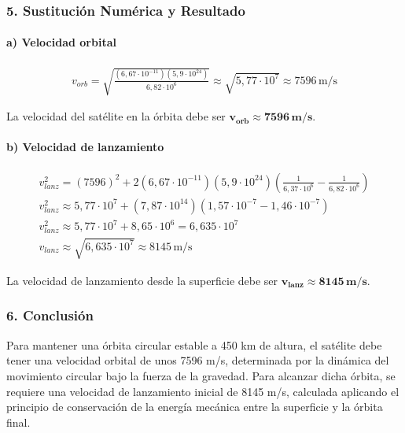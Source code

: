\subsubsection*{5. Sustitución Numérica y Resultado}
\paragraph{a) Velocidad orbital}
\begin{gather}
    v_{orb} = \sqrt{\frac{(6,67\cdot10^{-11})(5,9\cdot10^{24})}{6,82 \cdot 10^6}} \approx \sqrt{5,77 \cdot 10^7} \approx 7596 \, \text{m/s}
\end{gather}
\begin{cajaresultado}
La velocidad del satélite en la órbita debe ser $\boldsymbol{v_{orb} \approx 7596 \, \textbf{m/s}}$.
\end{cajaresultado}

\paragraph{b) Velocidad de lanzamiento}
\begin{gather}
    v_{lanz}^2 = (7596)^2 + 2(6,67\cdot10^{-11})(5,9\cdot10^{24})\left(\frac{1}{6,37\cdot10^6} - \frac{1}{6,82\cdot10^6}\right) \nonumber \\
    v_{lanz}^2 \approx 5,77 \cdot 10^7 + (7,87 \cdot 10^{14})(1,57 \cdot 10^{-7} - 1,46 \cdot 10^{-7}) \nonumber \\
    v_{lanz}^2 \approx 5,77 \cdot 10^7 + 8,65 \cdot 10^6 = 6,635 \cdot 10^7 \nonumber \\
    v_{lanz} \approx \sqrt{6,635 \cdot 10^7} \approx 8145 \, \text{m/s}
\end{gather}
\begin{cajaresultado}
La velocidad de lanzamiento desde la superficie debe ser $\boldsymbol{v_{lanz} \approx 8145 \, \textbf{m/s}}$.
\end{cajaresultado}

\subsubsection*{6. Conclusión}
\begin{cajaconclusion}
Para mantener una órbita circular estable a 450 km de altura, el satélite debe tener una velocidad orbital de unos 7596 m/s, determinada por la dinámica del movimiento circular bajo la fuerza de la gravedad. Para alcanzar dicha órbita, se requiere una velocidad de lanzamiento inicial de 8145 m/s, calculada aplicando el principio de conservación de la energía mecánica entre la superficie y la órbita final.
\end{cajaconclusion}

